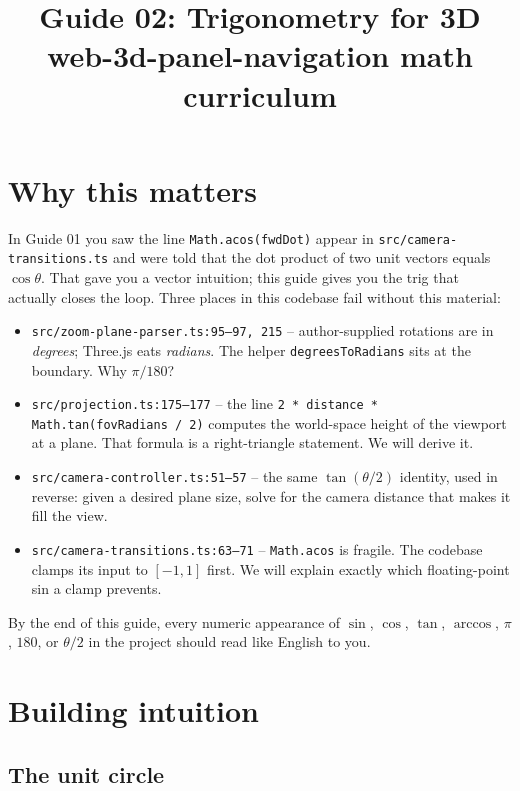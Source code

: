 \documentclass{article}
\title{Guide 02: Trigonometry for 3D \\ \large web-3d-panel-navigation math curriculum}
\author{}
\date{}
\begin{document}
\maketitle

\section{Why this matters}

In Guide 01 you saw the line \lstinline{Math.acos(fwdDot)} appear in
\texttt{src/camera-transitions.ts} and were told that the dot product of two
unit vectors equals $\cos\theta$. That gave you a vector intuition; this guide
gives you the trig that actually closes the loop. Three places in this codebase
fail without this material:

\begin{itemize}
  \item \texttt{src/zoom-plane-parser.ts:95--97, 215} -- author-supplied
    rotations are in \emph{degrees}; Three.js eats \emph{radians}. The helper
    \lstinline{degreesToRadians} sits at the boundary. Why $\pi/180$?
  \item \texttt{src/projection.ts:175--177} -- the line
    \lstinline{2 * distance * Math.tan(fovRadians / 2)} computes the world-space
    height of the viewport at a plane. That formula is a right-triangle
    statement. We will derive it.
  \item \texttt{src/camera-controller.ts:51--57} -- the same
    $\tan(\theta/2)$ identity, used in reverse: given a desired plane size,
    solve for the camera distance that makes it fill the view.
  \item \texttt{src/camera-transitions.ts:63--71} -- \lstinline{Math.acos} is
    fragile. The codebase clamps its input to $[-1,1]$ first. We will explain
    exactly which floating-point sin a clamp prevents.
\end{itemize}

By the end of this guide, every numeric appearance of
$\sin$, $\cos$, $\tan$, $\arccos$, $\pi$, $180$, or $\theta/2$ in the
project should read like English to you.

\section{Building intuition}

\subsection{The unit circle}
\end{document}
